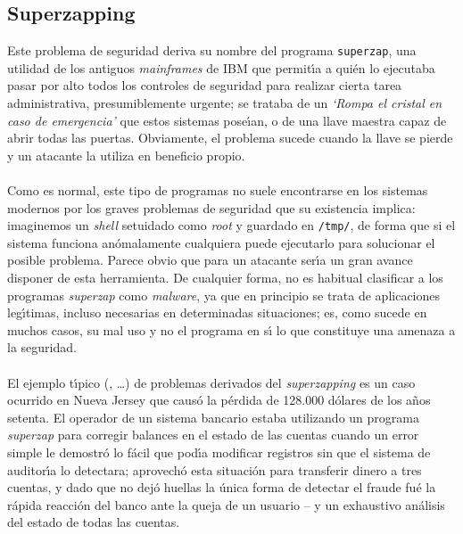 \subsection{Superzapping}
Este problema de seguridad deriva su nombre del programa {\tt superzap}, una
utilidad de los antiguos {\it mainframes} de IBM que permit\'{\i}a a qui\'en
lo ejecutaba pasar por alto todos los controles de seguridad para realizar
cierta tarea administrativa, presumiblemente urgente; se trataba de un {\it 
`Rompa el cristal en caso de emergencia'} que estos sistemas pose\'{\i}an, o 
de una llave maestra capaz de abrir todas las puertas. Obviamente, el problema
sucede cuando la llave se pierde y un atacante la utiliza en beneficio propio.\\
\\Como es normal, este tipo de programas no suele encontrarse en los sistemas 
modernos por los graves problemas de seguridad que su existencia implica: 
imaginemos un {\it shell} setuidado como {\it root} y guardado en {\tt /tmp/},
de forma que si el sistema funciona an\'omalamente cualquiera puede ejecutarlo
para solucionar el posible problema. Parece obvio que para un atacante 
ser\'{\i}a un gran avance disponer de esta herramienta. De cualquier forma, no
es habitual clasificar a los programas {\it superzap} como {\it malware}, ya
que en principio se trata de aplicaciones leg\'{\i}timas, incluso necesarias
en determinadas situaciones; es, como sucede en muchos casos, su mal uso y no
el programa en s\'{\i} lo que constituye una amenaza a la seguridad.\\
\\El ejemplo t\'{\i}pico (\cite{kn:isv95}, \cite{kn:par81}\ldots) de problemas 
derivados del {\it superzapping} es un
caso ocurrido en Nueva Jersey que caus\'o la p\'erdida de 128.000 d\'olares de
los a\~nos setenta. El operador de un sistema bancario estaba utilizando un
programa {\it superzap} para corregir balances en el estado de las cuentas 
cuando un error simple le demostr\'o lo f\'acil que pod\'{\i}a modificar 
registros sin que el sistema de auditor\'{\i}a lo detectara; aprovech\'o esta
situaci\'on para transferir dinero a tres cuentas, y dado que no dej\'o huellas
la \'unica forma de detectar el fraude fu\'e la r\'apida reacci\'on del banco
ante la queja de un usuario -- y un exhaustivo an\'alisis del estado de todas 
las cuentas.
